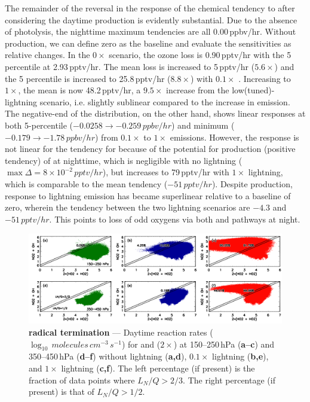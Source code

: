 The remainder of the reversal in the response of the  chemical tendency to {\lnox} after considering the
daytime production is evidently substantial. Due to the absence of photolysis, the nighttime maximum tendencies
are all 0.00\,\unit{ppbv/hr}. Without production, we can define zero as the baseline and evaluate the sensitivities as
relative changes. In the $0\times$ scenario, the ozone loss is 0.90\,\unit{pptv/hr} with the 5 percentile at 2.93\,\unit{pptv/hr}.
The mean loss is increased to 5\,\unit{pptv/hr} ($5.6\times$) and the 5 percentile is increased to 25.8\,\unit{pptv/hr}
($8.8\times$) with $0.1\times$ {\lnox}. Increasing {\lnox} to $1\times$, the mean is now 48.2\,\unit{pptv/hr}, a $9.5\times$
increase from the low(tuned)-lightning scenario, i.e. slightly sublinear compared to the increase in emission. The
negative-end of the distribution, on the other hand, shows linear responses at both 5-percentile ($-0.0258\rightarrow-0.259\,\unit{ppbv/hr}$)
and minimum ($-0.179\rightarrow-1.78\,\unit{ppbv/hr}$) from $0.1\times$ to $1\times$ emissions. However, the response
is not linear for the tendency for  because of the potential for production (positive tendency) of 
at nighttime, which is negligible with no lightning ($\max\Delta = 8\times10^{-2}\,\unit{pptv/hr}$), but increases to 79\,\unit{pptv/hr}
with $1\times$ lightning, which is comparable to the mean tendency ($-51\,\unit{pptv/hr}$). Despite production, response
to lightning emission has became superlinear relative to a baseline of zero, wherein the  tendency between
the two lightning scenarios are $-4.3$ and $-51\,\unit{pptv/hr}$. This points to loss of odd oxygens via both  and
 pathways at night.

	\begin{figure}[t!]
		\centering
		\includegraphics[width=1.0\textwidth]{sens/rxn}
		
		\caption[ radical termination]{\label{fig:2006/ltngsens_rxn}\textbf{ radical termination}
		--- Daytime reaction rates ($\log_{10}\,\unit{molecules\,cm^{-3}\,s^{-1}}$) for  and ($2\times$)
		 at 150--250\,\unit{hPa} ({\bf a--c}) and 350--450\,\unit{hPa} ({\bf d--f}) without lightning ({\bf a,d}),
		$0.1\times$ lightning ({\bf b,e}), and $1\times$ lightning ({\bf c,f}). The left percentage (if present) is the fraction
		of data points where $L_N/Q>2/3$. The right percentage (if present) is that of $L_N/Q>1/2$.}\vspace{-.3in}
	\end{figure}

